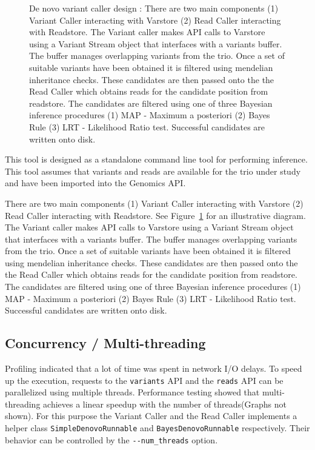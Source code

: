 \documentclass{article}
\begin{document}
\begin{figure}
\caption{ De novo variant caller design : There are two main components (1) Variant Caller interacting with Varstore (2) Read Caller interacting with Readstore. The Variant caller makes API calls to Varstore using a Variant Stream object that interfaces with a variants buffer. The buffer manages overlapping variants from the trio. Once a set of suitable variants have been obtained it is filtered using mendelian inheritance checks. These candidates are then passed onto the the Read Caller which obtains reads for the candidate position from readstore. The candidates are filtered using one of three Bayesian inference procedures (1) MAP - Maximum a posteriori (2) Bayes Rule (3) LRT - Likelihood Ratio test. Successful candidates are written onto disk.}
\label{fig:design}
\end{figure}

This tool is designed as a standalone command line tool for performing inference. This tool assumes that variants and reads are available for the trio under study and have been imported into the Genomics API.

\vspace{1em}
There are two main components (1) Variant Caller interacting with Varstore (2) Read Caller interacting with Readstore. See Figure~\ref{fig:design} for an illustrative diagram. The Variant caller makes API calls to Varstore using a Variant Stream object that interfaces with a variants buffer. The buffer manages overlapping variants from the trio. Once a set of suitable variants have been obtained it is filtered using mendelian inheritance checks. These candidates are then passed onto the the Read Caller which obtains reads for the candidate position from readstore. The candidates are filtered using one of three Bayesian inference procedures (1) MAP - Maximum a posteriori (2) Bayes Rule (3) LRT - Likelihood Ratio test. Successful candidates are written onto disk.

\subsection{Concurrency / Multi-threading}
Profiling indicated that a lot of time was spent in network I/O delays. To speed up the execution, requests to the \verb|variants| API and the \verb|reads| API can be parallelized using multiple threads. Performance testing showed that multi-threading achieves a linear speedup with the number of threads(Graphs not shown). For this purpose the Variant Caller and the Read Caller implements a helper class \verb|SimpleDenovoRunnable| and \verb|BayesDenovoRunnable| respectively. Their behavior can be controlled by the \verb|--num_threads| option.
\end{document}
